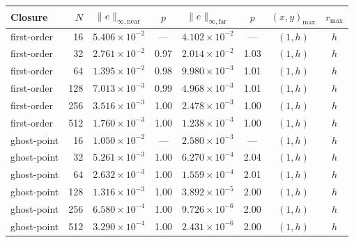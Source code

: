\begin{tabular}{@{}lrcccccc@{}}\toprule
Closure & $N$ & $\|e\|_{\infty,\mathrm{near}}$ & $p$ & $\|e\|_{\infty,\mathrm{far}}$ & $p$ & $(x,y)_{\max}$ & $r_{\max}$\\\midrule
first-order & 16 & $5.406\times10^{-2}$ & --- & $4.102\times10^{-2}$ & --- & $(1,h)$ & $h$\\
first-order & 32 & $2.761\times10^{-2}$ & 0.97 & $2.014\times10^{-2}$ & 1.03 & $(1,h)$ & $h$\\
first-order & 64 & $1.395\times10^{-2}$ & 0.98 & $9.980\times10^{-3}$ & 1.01 & $(1,h)$ & $h$\\
first-order & 128 & $7.013\times10^{-3}$ & 0.99 & $4.968\times10^{-3}$ & 1.01 & $(1,h)$ & $h$\\
first-order & 256 & $3.516\times10^{-3}$ & 1.00 & $2.478\times10^{-3}$ & 1.00 & $(1,h)$ & $h$\\
first-order & 512 & $1.760\times10^{-3}$ & 1.00 & $1.238\times10^{-3}$ & 1.00 & $(1,h)$ & $h$\\
\midrule
ghost-point & 16 & $1.050\times10^{-2}$ & --- & $2.580\times10^{-3}$ & --- & $(1,h)$ & $h$\\
ghost-point & 32 & $5.261\times10^{-3}$ & 1.00 & $6.270\times10^{-4}$ & 2.04 & $(1,h)$ & $h$\\
ghost-point & 64 & $2.632\times10^{-3}$ & 1.00 & $1.559\times10^{-4}$ & 2.01 & $(1,h)$ & $h$\\
ghost-point & 128 & $1.316\times10^{-3}$ & 1.00 & $3.892\times10^{-5}$ & 2.00 & $(1,h)$ & $h$\\
ghost-point & 256 & $6.580\times10^{-4}$ & 1.00 & $9.726\times10^{-6}$ & 2.00 & $(1,h)$ & $h$\\
ghost-point & 512 & $3.290\times10^{-4}$ & 1.00 & $2.431\times10^{-6}$ & 2.00 & $(1,h)$ & $h$\\
\bottomrule
\end{tabular}
